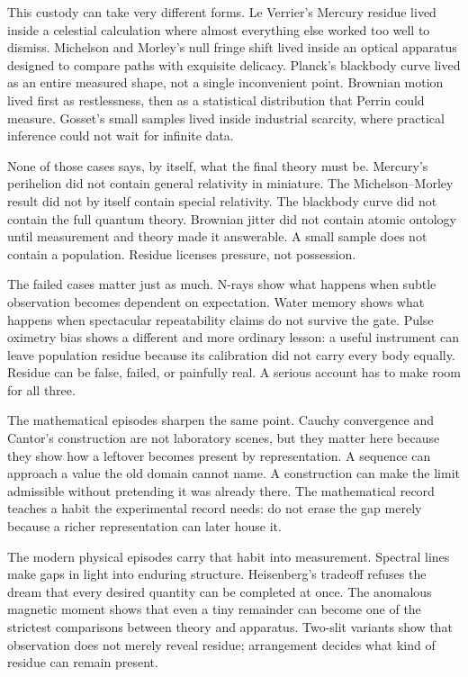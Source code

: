 \begin{chapteressay}
This custody can take very different forms. Le Verrier's Mercury residue lived
inside a celestial calculation where almost everything else worked too well to
dismiss. Michelson and Morley's null fringe shift lived inside an optical
apparatus designed to compare paths with exquisite delicacy. Planck's
blackbody curve lived as an entire measured shape, not a single inconvenient
point. Brownian motion lived first as restlessness, then as a statistical
distribution that Perrin could measure. Gosset's small samples lived inside
industrial scarcity, where practical inference could not wait for infinite
data.

None of those cases says, by itself, what the final theory must be. Mercury's
perihelion did not contain general relativity in miniature. The
Michelson--Morley result did not by itself contain special relativity. The
blackbody curve did not contain the full quantum theory. Brownian jitter did
not contain atomic ontology until measurement and theory made it answerable. A
small sample does not contain a population. Residue licenses pressure, not
possession.

The failed cases matter just as much. N-rays show what happens when subtle
observation becomes dependent on expectation. Water memory shows what happens
when spectacular repeatability claims do not survive the gate. Pulse oximetry
bias shows a different and more ordinary lesson: a useful instrument can leave
population residue because its calibration did not carry every body equally.
Residue can be false, failed, or painfully real. A serious account has to make
room for all three.

The mathematical episodes sharpen the same point. Cauchy convergence and
Cantor's construction are not laboratory scenes, but they matter here because
they show how a leftover becomes present by representation. A sequence can
approach a value the old domain cannot name. A construction can make the limit
admissible without pretending it was already there. The mathematical record
teaches a habit the experimental record needs: do not erase the gap merely
because a richer representation can later house it.

The modern physical episodes carry that habit into measurement. Spectral lines
make gaps in light into enduring structure. Heisenberg's tradeoff refuses the
dream that every desired quantity can be completed at once. The anomalous
magnetic moment shows that even a tiny remainder can become one of the
strictest comparisons between theory and apparatus. Two-slit variants show
that observation does not merely reveal residue; arrangement decides what kind
of residue can remain present.


\end{chapteressay}
